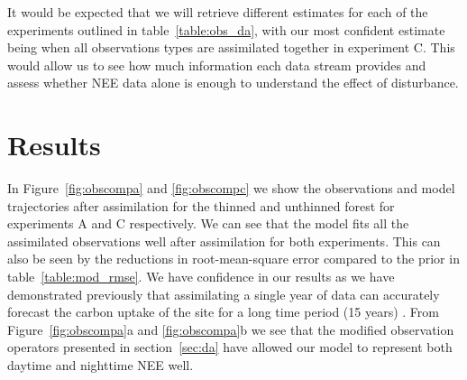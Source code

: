 \documentclass[draft,linenumbers]{agujournal}
\begin{document}
It would be expected that we will retrieve different estimates for each of the experiments outlined in table~\ref{table:obs_da}, with our most confident estimate being when all observations types are assimilated together in experiment C. This would allow us to see how much information each data stream provides and assess whether NEE data alone is enough to understand the effect of disturbance.

\section{Results} \label{sec:results}

In Figure~\ref{fig:obscompa} and \ref{fig:obscompc} we show the observations and model trajectories after assimilation for the  thinned and unthinned forest for experiments A and C respectively. We can see that the model fits all the assimilated observations well after assimilation for both experiments. {\color{blue}This can also be seen by the reductions in root-mean-square error compared to the prior in table~\ref{table:mod_rmse}}. We have confidence in our results as we have demonstrated previously that assimilating a single year of data can accurately forecast the carbon uptake of the site for a long time period (15 years) \citep{Pinnington2016299}. From Figure~\ref{fig:obscompa}a and \ref{fig:obscompa}b we see that the modified observation operators presented in section~\ref{sec:da} have allowed our model to represent both daytime and nighttime NEE well. 
\end{document}
